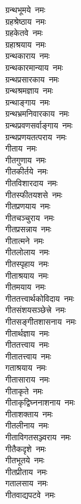 \begin{multicols}{2}
\begin{flushleft}
ग्रन्थभूमये~नमः\hfill{}\\
ग्रहश्रेष्ठाय~नमः\\
ग्रहकेतवे~नमः\\
ग्रहाश्रयाय~नमः\\
ग्रन्थकाराय~नमः\\
ग्रन्थकारमान्याय~नमः\\
ग्रन्थप्रसारकाय~नमः\\
ग्रन्थश्रमज्ञाय~नमः\\
ग्रन्थाङ्गाय~नमः\\
ग्रन्थभ्रमनिवारकाय~नमः\\
ग्रन्थप्रवणसर्वाङ्गाय~नमः\hfill{}\\
ग्रन्थप्रणयतत्पराय~नमः\\
गीताय~नमः\\
गीतगुणाय~नमः\\
गीतकीर्तये~नमः\\
गीतविशारदाय~नमः\\
गीतस्फीतयशसे~नमः\\
गीतप्रणयाय~नमः\\
गीतचञ्चुराय~नमः\\
गीतप्रसन्नाय~नमः\\
गीतात्मने~नमः\hfill{}\\
गीतलोलाय~नमः\\
गीतस्पृहाय~नमः\\
गीताश्रयाय~नमः\\
गीतमयाय~नमः\\
गीततत्त्वार्थकोविदाय~नमः\\
गीतसंशयसञ्छेत्त्रे~नमः\\
गीतसङ्गीतशासनाय~नमः\\
गीतार्थज्ञाय~नमः\\
गीततत्त्वाय~नमः\\
गीतातत्त्वाय~नमः\hfill{}\\
गताश्रयाय~नमः\\
गीतासाराय~नमः\\
गीताकृते~नमः\\
गीताकृद्विघ्ननाशनाय~नमः\\
गीताशक्ताय~नमः\\
गीतलीनाय~नमः\\
गीताविगतसञ्ज्वराय~नमः\\
गीतैकदृशे~नमः\\
गीतभूतये~नमः\\
गीतप्रीताय~नमः\hfill{}\\
गतालसाय~नमः\\
गीतवाद्यपटवे~नमः\\

\end{flushleft}
\end{multicols}
